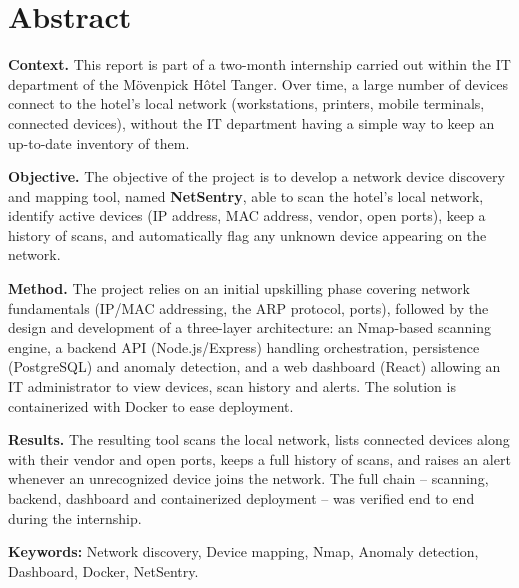 \chapter*{Abstract}

\noindent\textbf{Context.} This report is part of a two-month internship carried out
within the IT department of the Mövenpick Hôtel Tanger. Over time, a large number of
devices connect to the hotel's local network (workstations, printers, mobile terminals,
connected devices), without the IT department having a simple way to keep an up-to-date
inventory of them.

\vspace{0.3cm}
\noindent\textbf{Objective.} The objective of the project is to develop a network
device discovery and mapping tool, named \textbf{NetSentry}, able to scan the hotel's
local network, identify active devices (IP address, MAC address, vendor, open ports),
keep a history of scans, and automatically flag any unknown device appearing on the
network.

\vspace{0.3cm}
\noindent\textbf{Method.} The project relies on an initial upskilling phase covering
network fundamentals (IP/MAC addressing, the ARP protocol, ports), followed by the
design and development of a three-layer architecture: an Nmap-based scanning engine, a
backend API (Node.js/Express) handling orchestration, persistence (PostgreSQL) and
anomaly detection, and a web dashboard (React) allowing an IT administrator to view
devices, scan history and alerts. The solution is containerized with Docker to ease
deployment.

\vspace{0.3cm}
\noindent\textbf{Results.} The resulting tool scans the local network, lists connected
devices along with their vendor and open ports, keeps a full history of scans, and
raises an alert whenever an unrecognized device joins the network. The full chain --
scanning, backend, dashboard and containerized deployment -- was verified end to end
during the internship.

\vspace{0.5cm}
\noindent \textbf{Keywords:} Network discovery, Device mapping, Nmap, Anomaly
detection, Dashboard, Docker, NetSentry.
